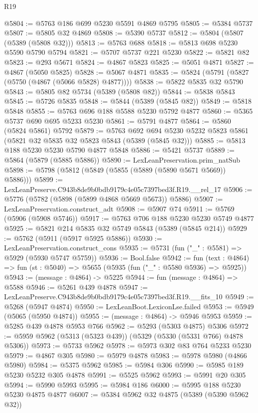\begin{lexlean}{R19}
\begin{coremodule}
@5804 := @5763 @186 @699 @5230 @5591 @4869 @5795
@5805 := @5384 @5737
@5807 := @5805 @32 @4869
@5808 := @5390 @5737
@5812 := @5804 (@5807 (@5389 (@5808 @32)))
@5813 := @5763 @688
@5818 := @5813 @698 @5230 @5590 @5790 @5794
@5821 := @5707 @5737 @221 @5230
@5822 := @5821 @82
@5823 := @293 @5671
@5824 := @4867 @5823
@5825 := @5051 @4871
@5827 := @4867 (@5050 @5825)
@5828 := @5067 @4871
@5835 := @5824 (@5791 (@5827 (@5750 (@4867 (@5066 @5828) @4877))))
@5838 := @5822 @5835 @32 @5790
@5843 := @5805 @82 @5734 (@5389 (@5808 @82))
@5844 := @5838 @5843
@5845 := @5726 @5835
@5848 := @5844 (@5389 (@5845 @82))
@5849 := @5818 @5848
@5855 := @5763 @696 @188 @5588 @5230 @5792 @4877
@5860 := @5365 @5737 @690 @695 @5233 @5230
@5861 := @5791 @4877
@5864 := @5860 (@5824 @5861) @5792
@5879 := @5763
    @692
    @694
    @5230
    @5232
    @5823
    @5861
    (@5821 @32 @5835 @32 @5823 @5843 (@5389 (@5845 @32)))
@5885 := @5813 @188 @5230 @5230 @5790 @4877 @5848
@5886 := @5421 @5737
@5889 := @5864 (@5879 (@5885 @5886))
@5890 := LexLeanPreservation.prim_natSub
@5898 := @5798 (@5812 (@5849 (@5855 (@5889 (@5890 @5671 @5669)) @5886)))
@5899 := LexLeanPreserve.C943b8de9b0bdb9179c4e05c7397bed3f.R19.__rel_17
@5906 := @5776 (@5782 (@5898 (@5899 @4868 @5669 @5673)) @5886)
@5907 := LexLeanPreservation.construct_adt
@5908 := @5907 @74
@5911 := @5769 (@5906 (@5908 @5746))
@5917 := @5763 @706 @188 @5230 @5230 @5749 @4877
@5925 := @5821 @214 @5835 @32 @5749 @5843 (@5389 (@5845 @214))
@5929 := @5762 (@5911 (@5917 @5925 @5886))
@5930 := LexLeanPreservation.construct_cons
@5935 := @5731 (fun ("_" : @5581) => @5929 (@5930 @5747 @5759))
@5936 := Bool.false
@5942 := fun (text : @4864) => fun (st : @5040) => @5655 (@5935 (fun ("_" : @5580 @5936) => @5925))
@5943 := (message : @4864) -> @5225
@5944 := fun (message : @4864) => @5588
@5946 := @5261 @439 @4878
@5947 := LexLeanPreserve.C943b8de9b0bdb9179c4e05c7397bed3f.R19.__fits_10
@5949 := @5268 (@5947 @4874)
@5950 := LexLeanBoot.LexiconLse.failed
@5953 := @5949 (@5065 (@5950 @4874))
@5955 := (message : @4864) -> @5946 @5953
@5959 := @5285 @439 @4878 @5953 @766
@5962 := @5293 (@5303 @4875) @5306
@5972 := @5959 @5962 (@5313 (@5323 @439)) (@5329 (@5330 (@5331 @766) @4878 @5306))
@5973 := @5733 @5962
@5978 := @5973 @302 @83 @764 @5233 @5230
@5979 := @4867 @305
@5980 := @5979 @4878
@5983 := @5978 @5980 (@4866 @5980)
@5984 := @5375 @5962
@5985 := @5984 @306
@5990 := @5985 @189 @5230 @5232 @305 @4878
@5991 := @5525 @5962
@5993 := @5991 @20 @305
@5994 := @5990 @5993
@5995 := @5984 @186
@6000 := @5995 @188 @5230 @5230 @4875 @4877
@6007 := @5384 @5962 @32 @4875 (@5389 (@5390 @5962 @32))

\end{coremodule}
\end{lexlean}
